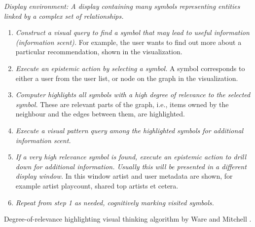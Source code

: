\begin{table}
	\textit{Display environment: A display containing many symbols representing entities linked by a complex set of relationships.}

	\begin{enumerate}
		\item \textit{Construct a visual query to find a symbol that may lead to useful information (information scent).} For example, the user wants to find out more about a particular recommendation, shown in the visualization.
		\item \textit{Execute an epistemic action by selecting a symbol.} A symbol corresponds to either a user from the user list, or node on the graph in the visualization.
		\item \textit{Computer highlights all symbols with a high degree of relevance to the selected symbol.} These are relevant parts of the graph, i.e., items owned by the neighbour and the edges between them, are highlighted.
		\item \textit{Execute a visual pattern query among the highlighted symbols for additional information scent.}
		\item \textit{If a very high relevance symbol is found, execute an epistemic action to drill down for additional information. Usually this will be presented in a different display window.} In this window artist and user metadata are shown, for example artist playcount, shared top artists et cetera.
		\item \textit{Repeat from step 1 as needed, cognitively marking visited symbols.}
	\end{enumerate}
\caption{Degree-of-relevance highlighting visual thinking algorithm by Ware and Mitchell \cite{ware:2004}.}
\label{table:visual_thinking_algorithm}
\end{table}

